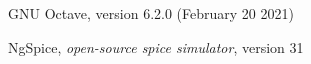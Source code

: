 \begin{thebibliography}{9}
\label{bibliography}

GNU Octave, version 6.2.0 (February 20 2021)

NgSpice, \emph{open-source spice simulator}, version 31
\end{thebibliography}
